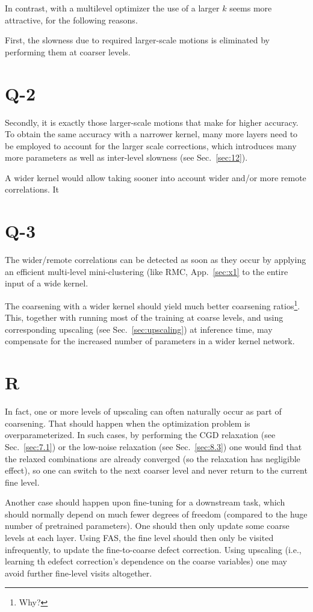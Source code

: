 \documentclass{article} %
\begin{document}
In contrast, with a multilevel optimizer the use of a larger $k$ seems more attractive, for the following reasons.

First, the slowness due to required larger-scale motions is eliminated by performing them at coarser levels.

\section{Q-2}
Secondly, it is exactly those larger-scale motions that make for higher accuracy. To obtain the same accuracy with a narrower kernel, many more layers need to be employed to account for the larger scale corrections, which introduces many more parameters as well as inter-level slowness (see Sec.~\ref{sec:12}).

A wider kernel would allow taking sooner into account wider and/or more remote correlations. It

\section{Q-3}
The wider/remote correlations can be detected as soon as they occur by applying an efficient multi-level mini-clustering (like RMC, App.~\ref{sec:x1} to the entire input of a wide kernel.

The coarsening with a wider kernel should yield much better coarsening ratios\footnote{Why?}. This, together with running most of the training at coarse levels, and using corresponding upscaling (see Sec.~\ref{sec:upscaling}) at inference time, may compensate for the increased number of parameters in a wider kernel network.

\section{R}
In fact, one or more levels of upscaling can often naturally occur as part of coarsening. That should happen when the optimization problem is overparameterized. In such cases, by performing the CGD relaxation (see Sec.~\ref{sec:7.1}) or the low-noise relaxation (see Sec.~\ref{sec:8.3}) one would find that the relaxed combinations are already converged (so the relaxation has negligible effect), so one can switch to the next coarser level and never return to the current fine level.

Another case should happen upon fine-tuning for a downstream task, which should normally depend on much fewer degrees of freedom (compared to the huge number of pretrained parameters). One should then only update some coarse levels at each layer. Using FAS, the fine level should then only be visited infrequently, to update the fine-to-coarse defect correction. Using upscaling (i.e., learning th edefect correction's dependence on the coarse variables) one may avoid further fine-level visits altogether.
\end{document}
